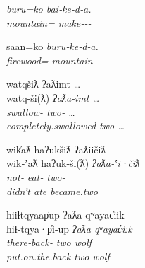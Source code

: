 \begin{exe}
  \ex\label{ex:1.3}
  \begin{xlist}

    \gll \em{buru}=ko                bai‑ke‑d‑a.\\
         \em{mountain}= make‑‑‑\\

    \gll saan=ko                \em{buru}‑ke‑d‑a.\\
         firewood= \em{mountain‑}‑‑\\

  \end{xlist}

  \ex\label{ex:1.4}
  \begin{xlist}

    \gllll watqšiƛ              ʔaƛimt            …\\
           watq‑ši(ƛ)           \em{ʔaƛa}‑imt      …\\
           swallow‑     \em{two}‑ …\\
           completely.swallowed two               …\\

    \gllll wik̓aƛ        haʔukšiƛ     ʔaƛiičiƛ\\
           wik‑ʼaƛ      haʔuk‑ši(ƛ)  \em{ʔaƛa}‑ʽi·čiƛ\\
           not‑ eat‑ \em{two}‑\\
           didn’t       ate          became.two\\

    \gllll hiiɬtqyaap̓up             ʔaƛa      qʷayac̓iik\\
           hiɬ‑tqya·p̓i‑up           \em{ʔaƛa} qʷayac̓iːk\\
           there‑back‑ \em{two}  wolf\\
           put.on.the.back          two       wolf\\


\end{xlist}
\end{exe}
